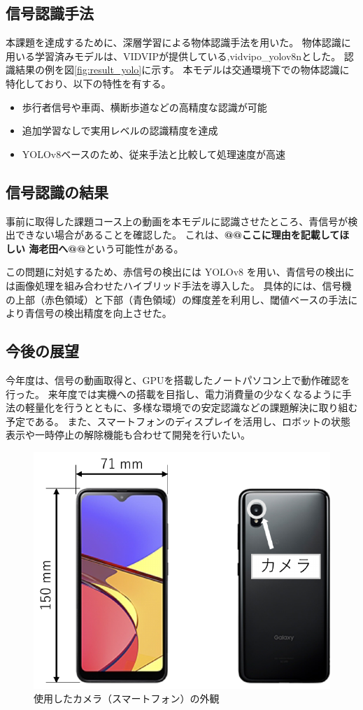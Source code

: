 \documentclass[twocolumn,9pt]{jsproceedings}
\begin{document}
\subsection{信号認識手法}
本課題を達成するために、深層学習による物体認識手法を用いた。
物体認識に用いる学習済みモデルは、VIDVIP\cite{BabaVIDVIP}が提供している,vidvipo\_yolov8nとした。
認識結果の例を図\ref{fig:result_yolo}に示す。
本モデルは交通環境下での物体認識に特化しており、以下の特性を有する。

\begin{itemize}
    \item 歩行者信号や車両、横断歩道などの高精度な認識が可能
    \item 追加学習なしで実用レベルの認識精度を達成
    \item YOLOv8ベースのため、従来手法と比較して処理速度が高速
\end{itemize}

\subsection{信号認識の結果}
事前に取得した課題コース上の動画を本モデルに認識させたところ、青信号が検出できない場合があることを確認した。
これは、\textbf{@@ここに理由を記載してほしい 海老田へ@@}という可能性がある。

この問題に対処するため、赤信号の検出には YOLOv8 を用い、青信号の検出には画像処理を組み合わせたハイブリッド手法を導入した。
具体的には、信号機の上部（赤色領域）と下部（青色領域）の輝度差を利用し、閾値ベースの手法により青信号の検出精度を向上させた。

\subsection{今後の展望}
今年度は、信号の動画取得と、GPUを搭載したノートパソコン上で動作確認を行った。
来年度では実機への搭載を目指し、電力消費量の少なくなるように手法の軽量化を行うとともに、多様な環境での安定認識などの課題解決に取り組む予定である。
また、スマートフォンのディスプレイを活用し、ロボットの状態表示や一時停止の解除機能も合わせて開発を行いたい。

\begin{figure}[h]
  \begin{center}
    \includegraphics[width=0.6\linewidth]{figs/smartphone.pdf}
    \caption{使用したカメラ（スマートフォン）の外観}
    \label{fig:smartphone}
  \end{center}
\end{figure}
\end{document}
